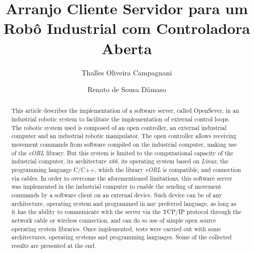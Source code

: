 	
\begin{frontmatter}
    
    \title{Arranjo Cliente Servidor para um Robô Industrial com Controladora Aberta}  
    
    
    \author[First]{Thalles Oliveira Campagnani}  \author[First]{Renato de Sousa Dâmaso}
    
    \address[First]{Depto. de Eng. Mecatrônica do CEFET-MG, Unidade de Divinópolis 
    (thallescampagnani@gmail.com;  renatosd@cefetmg.br)}
    
    \renewcommand{\abstractname}{{\bf Abstract:~}}
    
    \begin{abstract}                %
        This article describes the implementation of a software server, called OpenSever, in an industrial robotic system to facilitate the implementation of external control loops. The robotic system used is composed of an open controller, an external industrial computer and an industrial robotic manipulator. The open controller allows receiving movement commands from software compiled on the industrial computer, making use of the \textit{eORL} library. But this system is limited to the computational capacity of the industrial computer, its architecture \textit{x86}, its operating system based on \textit{Linux}, the programming language C/C++, which the library \textit{eORL} is compatible, and connection via cables. In order to overcome the aforementioned limitations, this software server was implemented in the industrial computer to enable the sending of movement commands by a software client on an external device. Such device can be of any architecture, operating system and programmed in any preferred language, as long as it has the ability to communicate with the server via the TCP/IP protocol through the network cable or wireless connection, and can do so use of simple open source operating system libraries. Once implemented, tests were carried out with some architectures, operating systems and programming languages. Some of the collected results are presented at the end.


\end{abstract}
\end{frontmatter}
